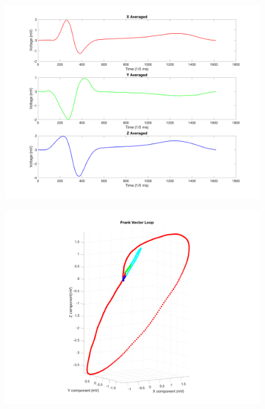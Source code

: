 \documentclass[12pt]{article}
\begin{document}
\begin{figure}[H]
	
	\centering
	\includegraphics[width = .95\textwidth]{Figures/FrankLeads3.png}
	\caption{ }
	\label{fig:Frank3}
\end{figure}

\begin{figure}[H]
	
	\centering
	\includegraphics[width = .95\textwidth]{Figures/FrankLeads_3d.png}
	\caption{ }
	\label{fig:Frank3D}
\end{figure}
\end{document}
